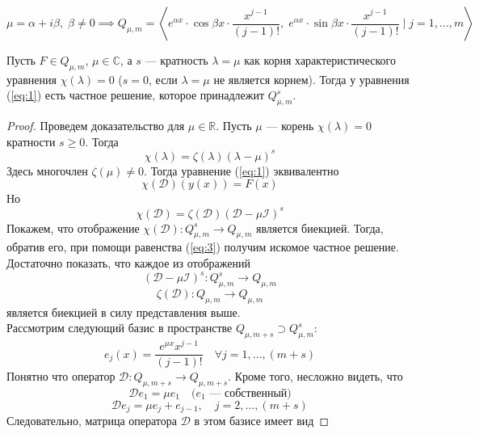 \documentclass[11pt]{article}
\begin{document}
\[\mu = \alpha + i \beta, \; \beta \neq 0  \implies Q_{\mu, m} = \left\langle e^{\alpha x} \cdot \cos \beta x \cdot \frac{x^{j - 1}}{(j - 1)!}, \; e^{\alpha x} \cdot \sin \beta x \cdot \frac{x^{j - 1}}{(j - 1)!} \; | \; j = 1, \ldots, m\right\rangle \]

\begin{theorem}
    Пусть $F \in Q_{\mu, m}$, $\mu \in \mathbb{C}$, а $s$ --- кратность $\lambda = \mu$ как корня характеристического уравнения $\chi(\lambda) = 0$ ($s = 0$, если $\lambda = \mu$ не является корнем). Тогда у уравнения (\ref{eq:1}) есть частное решение, которое принадлежит $Q_{\mu, m}^s$.
\end{theorem}

\begin{proof}

    Проведем доказательство для $\mu \in \mathbb{R}$. Пусть $\mu$ --- корень $\chi(\lambda) = 0$ кратности $s \geq 0$. Тогда
    \[\chi(\lambda) = \zeta(\lambda)(\lambda - \mu)^s\]
    Здесь многочлен $\zeta(\mu) \neq 0$. Тогда уравнение (\ref{eq:1}) эквивалентно
    \begin{equation} \label{eq:3}
        \chi(\mathcal{D})(y(x)) = F(x)
    \end{equation}
    Но
    \[\chi(\mathcal{D}) = \zeta(\mathcal{D})(\mathcal{D} - \mu \mathcal{I})^s\]
    Покажем, что отображение $\chi(\mathcal{D}) \colon Q_{\mu, m}^s \to Q_{\mu, m}$ является биекцией. Тогда, обратив его, при помощи равенства (\ref{eq:3}) получим искомое частное решение. \\
    Достаточно показать, что каждое из отображений 
    \begin{equation*}
        (\mathcal{D} - \mu \mathcal{I})^s \colon Q_{\mu, m}^s \to Q_{\mu, m}
    \end{equation*}
    \begin{equation*}
        \zeta(\mathcal{D}) \colon Q_{\mu, m} \to Q_{\mu, m}
    \end{equation*}
    является биекцией в силу представления выше. \\
    Рассмотрим следующий базис в пространстве $Q_{\mu, m + s} \supset Q_{\mu, m}^s$:
    \[e_j(x) = \frac{e^{\mu x} x^{j - 1}}{(j - 1)!} \quad \forall j = 1, \ldots, (m + s)\]
    Понятно что оператор $\mathcal{D} \colon Q_{\mu, m + s} \to Q_{\mu, m + s}$. Кроме того, несложно видеть, что
    \[\mathcal{D} e_1 = \mu e_1 \quad \text{(} e_1 \text{ --- собственный)}\]
    \[\mathcal{D} e_j = \mu e_j + e_{j - 1}, \quad j = 2, \ldots, (m + s)\]
    Следовательно, матрица оператора $\mathcal{D}$ в этом базисе имеет вид

\end{proof}
\end{document}
